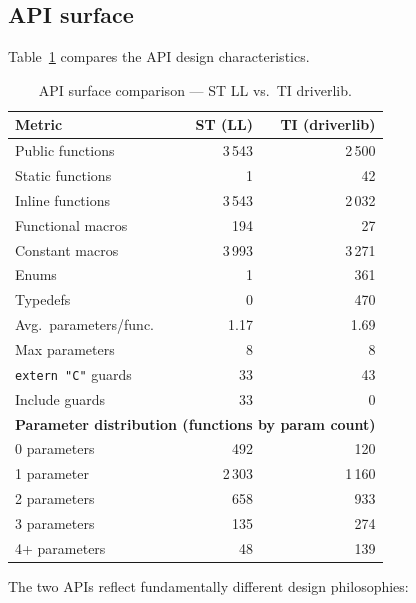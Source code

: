 \subsection{API surface}
\label{subsec:ti-api}

Table~\ref{tab:ti-api} compares the API design characteristics.

\begin{table}[H]
\centering
\caption{API surface comparison --- ST LL vs.\ TI driverlib.}
\label{tab:ti-api}
\begin{tabular}{l r r}
\toprule
\textbf{Metric} & \textbf{ST (LL)} & \textbf{TI (driverlib)} \\
\midrule
Public functions         &    3\,543 &    2\,500 \\
Static functions         &         1 &        42 \\
Inline functions         &    3\,543 &    2\,032 \\
Functional macros        &       194 &        27 \\
Constant macros          &     3\,993 &    3\,271 \\
Enums                    &         1 &       361 \\
Typedefs                 &         0 &       470 \\
\midrule
Avg.\ parameters/func.  &      1.17 &      1.69 \\
Max parameters           &         8 &         8 \\
\texttt{extern "C"} guards &    33 &        43 \\
Include guards           &        33 &         0 \\
\midrule
\multicolumn{3}{l}{\textbf{Parameter distribution (functions by param count)}} \\
0 parameters             &       492 &       120 \\
1 parameter              &     2\,303 &     1\,160 \\
2 parameters             &       658 &       933 \\
3 parameters             &       135 &       274 \\
4+ parameters            &        48 &       139 \\
\bottomrule
\end{tabular}
\end{table}

The two APIs reflect fundamentally different design philosophies:

